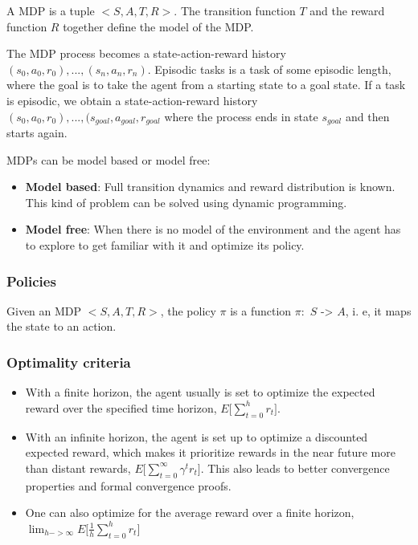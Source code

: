 A MDP is a tuple $\bigl< S, A, T, R \bigr>$. The transition function $T$ and the reward function $R$ together define the model of the MDP. 

The MDP process becomes a state-action-reward history $(s_0, a_0, r_0), ..., (s_n, a_n, r_n)$.
Episodic tasks is a task of some episodic length, where the goal is to take the agent from a  starting state to a goal state. If a task is episodic, we obtain a state-action-reward history $(s_0, a_0, r_0), ..., (s_{goal}, a_{goal}, r_{goal} $ where the process ends in state $s_{goal}$ and then starts again. 


MDPs can be model based or model free:
\begin{itemize}
    \item \textbf{Model based}: Full transition dynamics and reward distribution is known. This kind of problem can be solved using dynamic programming.
    \item \textbf{Model free}: When there is no model of the environment and the agent has to explore to get familiar with it and optimize its policy.
\end{itemize}


\subsubsection{Policies}

Given an MDP $\bigl< S, A, T, R \bigr>$, the policy $\pi$ is a function $\pi:$ $S$ -> $A$, i. e, it maps the state to an action. 


\subsubsection{Optimality criteria}

\begin{itemize}
    \item With a finite horizon, the agent usually is set to optimize the expected reward over the specified time horizon,  $E \bigl[ \sum_{t=0}^{h} r_t \bigr]$.
    \item With an infinite horizon, the agent is set up to optimize a discounted expected reward, which makes it prioritize rewards in the near future more than distant rewards,
    $E \bigl[ \sum_{t=0}^{\infty} \gamma^t r_t \bigr]$. This also leads to better convergence properties and formal convergence proofs.
    \item One can also optimize for the average reward over a finite horizon,
    $ \lim_{h-> \infty} E \bigl[ \frac{1}{h} \sum_{t=0}^{h} r_t \bigr]$
\end{itemize}

